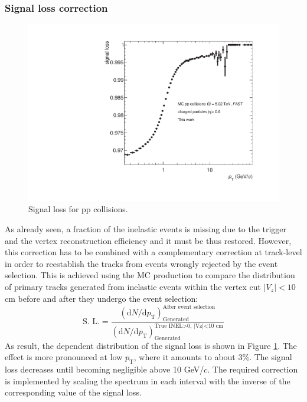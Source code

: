 \documentclass[12pt,a4paper]{report}
\begin{document}
\subsubsection{Signal loss correction}
\begin{figure}[tb!]
\centering
\includegraphics[width=12cm]{Plots/signalLossFAST.pdf}  
\caption{Signal loss for pp collisions.}
\label{sigLoss}
\end{figure}
As already seen, a fraction of the inelastic events is missing due to the trigger and the vertex reconstruction efficiency and it must be thus restored. However, this correction has to be combined with a complementary correction at track-level in order to reestablish the tracks from events wrongly rejected by the event selection. This is achieved using the MC production to compare the distribution of primary tracks generated from inelastic events within the vertex cut $|V_z| < 10$ cm before and after they undergo the event selection:
\begin{equation}
\text{S. L.} = \dfrac{(\text{d}N/\text{d}p_\text{T})_\text{Generated}^\text{After event selection}}{(\text{d}N/\text{d}p_\text{T})_\text{Generated}^\text{True INEL>0, |Vz|<10 cm}}
\end{equation}
As result, the \pt dependent distribution of the signal loss is shown in Figure \ref{sigLoss}. The effect is more pronounced at low $p_\text{T}$, where it amounts to about 3\%. The signal loss decreases until becoming negligible above 10 GeV/$c$. The required correction is implemented by scaling the \pt spectrum in each \pt interval with the inverse of the corresponding value of the signal loss.
\end{document}
